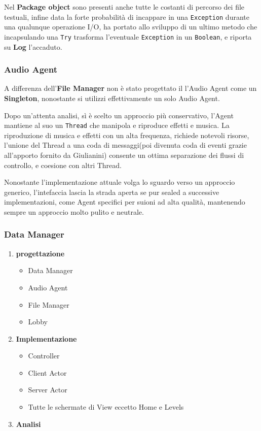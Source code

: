     Nel \textbf{Package object} sono presenti anche tutte le costanti 
    di percorso dei file testuali, infine data la forte probabilità di incappare in una \texttt{Exception} durante una qualunque operazione I/O, ha portato allo sviluppo di un ultimo metodo che incapsulando una \texttt{Try} trasforma l'eventuale  \texttt{Exception} in un \texttt{Boolean}, e riporta su \textbf{Log} l'accaduto.
    
    \subsubsection{Audio Agent}
    A differenza dell'\textbf{File Manager} non è stato progettato il l'Audio Agent come un \textbf{Singleton}, nonostante si utilizzi effettivamente un solo Audio Agent.
    
    Dopo un'attenta analisi, sì è scelto un approccio più conservativo, l'Agent mantiene al suo un \texttt{Thread} che 
    manipola e riproduce effetti e musica.
    La riproduzione di musica e effetti con un alta frequenza, richiede notevoli risorse, l'unione del Thread a una coda di messaggi(poi divenuta coda di eventi grazie all'apporto fornito da Giulianini) consente un ottima separazione dei flussi di controllo, e coesione con altri Thread.
    
    Nonostante l'implementazione attuale volga lo sguardo verso un approccio generico, l'intefaccia lascia la strada aperta se pur sealed a successive implementazioni, come Agent specifici per suioni ad alta qualità, mantenendo sempre un approccio molto pulito e neutrale.
    
    \subsubsection{Data Manager}


\begin{enumerate}
    \item \textbf{progettazione}
        \begin{itemize}
	        \item Data Manager
	        \item Audio Agent
	        \item File Manager
        	\item Lobby
        \end{itemize}
    \item \textbf{Implementazione}
        \begin{itemize}
            \item Controller
	        \item Client Actor
	        \item Server Actor
            \item Tutte le schermate di View eccetto Home e Levels
        \end{itemize}
    \item \textbf{Analisi}
\end{enumerate}

